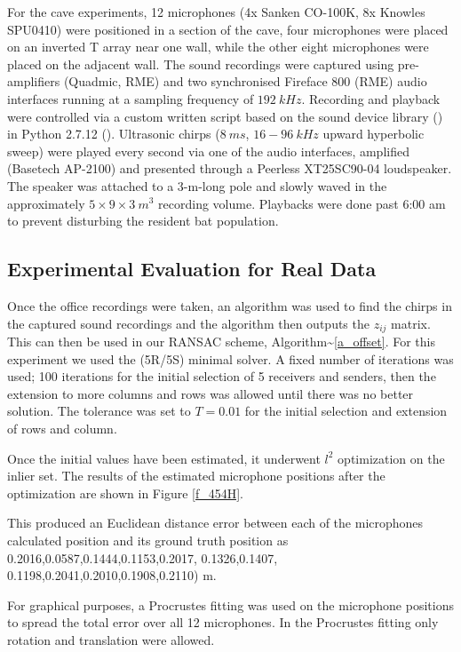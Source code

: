 \documentclass[
]{book}
\begin{document}
For the cave experiments, 12 microphones (4x Sanken CO-100K, 8x Knowles SPU0410) were positioned in a section of the cave, four microphones were placed on an inverted T array near one wall, while the other eight microphones were placed on the adjacent wall. The sound recordings were captured using pre-amplifiers (Quadmic, RME) and two synchronised Fireface 800 (RME) audio interfaces running at a sampling frequency of \(192 ~kHz\). Recording and playback were controlled via a custom written script based on the sound device library
(\cite{geier2015}) in Python 2.7.12 (\cite{van1995python}). Ultrasonic chirps (\(8~ms\), \(16-96~kHz\) upward hyperbolic sweep) were played every second via one of the audio interfaces, amplified (Basetech AP-2100) and presented through a Peerless XT25SC90-04 loudspeaker. The speaker was attached to a 3-m-long pole and slowly waved in the approximately \(5 \times 9 \times 3 ~m^3\) recording volume. Playbacks were done past 6:00 am to prevent disturbing the resident bat population.

\vspace{-5pt}
\subsection{Experimental Evaluation for Real Data}
\vspace{-5pt}

Once the office recordings were taken, an algorithm was used to find the chirps in the captured sound recordings and the algorithm then outputs the \(z_{ij}\) matrix. This can then be used in our RANSAC scheme, Algorithm\textasciitilde{}\ref{a_offset}. For this experiment we used the (5R/5S) minimal solver. A fixed number of iterations was used; 100 iterations for the initial selection of 5 receivers and senders, then the extension to more columns and rows was allowed until there was no better solution. The tolerance was set to \(T=0.01\) for the initial selection and extension of rows and column.

Once the initial values have been estimated, it underwent \(l^{2}\) optimization on the inlier set. The results of the estimated microphone positions after the optimization are shown in Figure \ref{f_454H}.

This produced an Euclidean distance error between each of the microphones calculated position and its ground truth position as 0.2016,0.0587,0.1444,0.1153,0.2017, 0.1326,0.1407, 0.1198,0.2041,0.2010,0.1908,0.2110) m.

For graphical purposes, a Procrustes fitting was used on the microphone positions to spread the total error over all 12 microphones. In the Procrustes fitting only rotation and translation were allowed.
\end{document}
